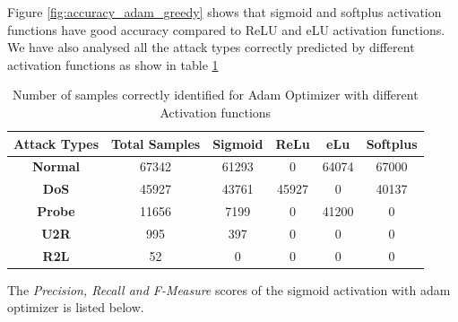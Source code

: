 \documentclass[12pt, a4paper]{report}
\begin{document}
Figure \ref{fig:accuracy_adam_greedy} shows that sigmoid and softplus activation functions have good accuracy compared to ReLU and eLU activation functions.
We have also analysed all the attack types correctly predicted by different activation functions as show in table \ref{confusion_adam}
\clearpage
\begin{table}[ht]
\centering
\captionsetup{justification=centering,margin=2cm}
\begin{tabular}{|c|c|c|c|c|c|}
\hline
\textbf{Attack Types} & \textbf{Total Samples} & \textbf{Sigmoid} & \textbf{ReLu} & \textbf{eLu} & \textbf{Softplus} \\ \hline
\textbf{Normal}       & 67342                  & 61293            & 0         & 64074        & 67000             \\ \hline
\textbf{DoS}          & 45927                  & 43761          		  & 45927         & 0         & 40137             \\ \hline
\textbf{Probe}        & 11656                  & 7199           		  & 0          & 41200         & 0              \\ \hline
\textbf{U2R}          & 995                    & 397              		& 0           & 0          & 0               \\ \hline
\textbf{R2L}          & 52                     & 0               		& 0            & 0           & 0                \\ \hline
\end{tabular}
\caption{Number of samples correctly identified for Adam Optimizer with different Activation functions}
\label{confusion_adam}
\end{table}
 
The \textit{Precision, Recall and F-Measure} scores of the sigmoid activation with adam optimizer is listed below.\\ \par
\end{document}
